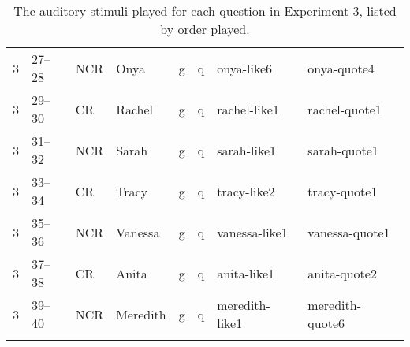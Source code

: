 \begin{table}[htbp]
\begin{center}
{\begin{tabular}{llllllll}
 3 & 27--28 & NCR & Onya & g & q & onya-like6 & onya-quote4 \\
 3 & 29--30 & CR & Rachel & g & q & rachel-like1 & rachel-quote1 \\
 3 & 31--32 & NCR & Sarah & g & q & sarah-like1 & sarah-quote1 \\
 3 & 33--34 & CR & Tracy & g & q & tracy-like2 & tracy-quote1 \\
 3 & 35--36 & NCR & Vanessa & g & q & vanessa-like1 & vanessa-quote1 \\
 3 & 37--38 & CR & Anita & g & q & anita-like1 & anita-quote2 \\
 3 & 39--40 & NCR & Meredith & g & q & meredith-like1 & meredith-quote6 \\
 
    \lspbottomrule
   
	\end{tabular}
}
	\caption{The auditory stimuli played for each question in Experiment 3, listed by order played.}\label{tab:appenExp3stimuli}
	\end{center}
\end{table}